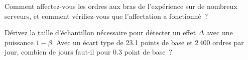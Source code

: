 \begin{interviewq}\label{iq:rs:live-experiments:5}
Comment affectez-vous les ordres aux bras de l'expérience sur de nombreux serveurs, et comment vérifiez-vous que l'affectation a fonctionné~?
\end{interviewq}

\begin{interviewq}\label{iq:rs:live-experiments:6}
Dérivez la taille d'échantillon nécessaire pour détecter un effet $\Delta$ avec une puissance $1-\beta$. Avec un écart type de 23.1 points de base et 2\,400 ordres par jour, combien
de jours faut-il pour 0.3 point de base~?
\end{interviewq}
